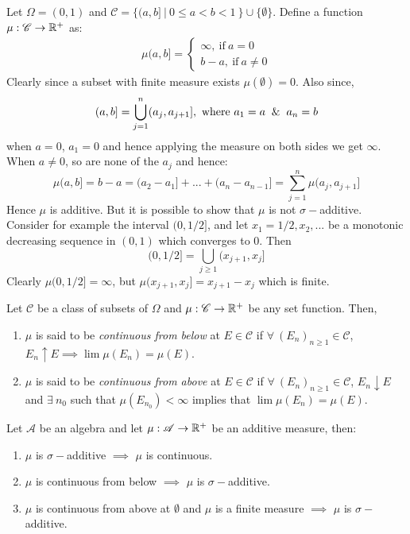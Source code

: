 \begin{example}
  Let $\Omega = (0,1)$ and $ \mathscr{C} = \{(a,b]\ |\ 0\leq a < b < 1\ \}\cup\{\emptyset\}$. Define a function $\mu: \mathscr{C}\to \mathbb{R}^+$ as:
  \begin{align*}
    \mu(a,b] = \begin{cases}
      \infty,\ \text{if}\ a=0\\
      b-a,\ \text{if}\ a\neq 0
    \end{cases}
  \end{align*}
  Clearly since a subset with finite measure exists $\mu(\emptyset) = 0$. Also since,
  \[(a,b] = \bigcup_{j=1}^n (a_j,a_{j+1}],\ \text{where}\ a_1 = a \And a_n=b\] 
  when $a=0$, $a_1 = 0$ and hence applying the measure on both sides we get $\infty$. When $a\neq 0$, so are none of the $a_j$ and hence:
  \[\mu(a,b] = b-a = (a_2 - a_1] + ... + (a_n - a_{n-1}] = \sum_{j=1}^n\mu(a_j,a_{j+1}]\]
  Hence $\mu$ is additive. But it is possible to show that $\mu$ is not $\sigma-$additive. Consider for example the interval $(0,1/2]$, and let $x_1=1/2,x_2,...$ be a monotonic decreasing sequence in $(0,1)$ which converges to $0$. Then
  \[(0,1/2] = \bigcup_{j\geq 1} (x_{j+1}, x_j]\]
  Clearly $\mu(0,1/2] = \infty$, but $\mu(x_{j+1},x_j] = x_{j+1} - x_j$ which is finite.
\end{example}
\begin{definition}
  Let $ \mathscr{C}$ be a class of subsets of $\Omega$ and $\mu: \mathscr{C}\to \mathbb{R}^+$ be any set function. Then,
  \begin{enumerate}
    \item $\mu$ is said to be \textit{continuous from below} at $E\in \mathscr{C}$ if $\forall\ (E_n)_{n\geq 1}\in \mathscr{C}$, $E_n \uparrow E \implies \lim\mu(E_n) = \mu(E)$.
    \item $\mu$ is said to be \textit{continuous from above} at $E\in \mathscr{C}$ if $\forall\ (E_n)_{n\geq 1}\in \mathscr{C}$, $E_n \downarrow E$ and $\exists\ n_0$ such that $\mu(E_{n_0}) <\infty$ implies that $\lim\mu(E_n)= \mu(E)$. 
  \end{enumerate}
\end{definition}
\begin{lemma}\label{lem:continuity}
  Let $ \mathscr{A}$ be an algebra and let $\mu: \mathscr{A}\to \mathbb{R}^+$ be an additive measure, then:
  \begin{enumerate}
    \item $\mu$ is $\sigma-$additive $\implies$ $\mu$ is continuous.
    \item $\mu$ is continuous from below $\implies$ $\mu$ is $\sigma-$additive.
    \item $\mu$ is continuous from above at $\emptyset$ and $\mu$ is a finite measure $\implies$ $\mu$ is $\sigma-$additive.
  \end{enumerate}
\end{lemma}
